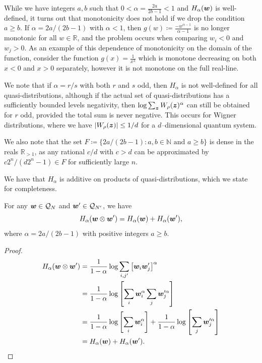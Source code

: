 \documentclass[pra,
aps,
twocolumn,
superscriptaddress,
groupedaddress,
nofootinbib,
reprint
]{revtex4-1}
\begin{document}
While we have integers $a,b$ such that $0 < \alpha=\frac{2a}{2b-1} < 1$ and $H_\alpha(\boldsymbol{w})$ is well-defined, it turns out that monotonicity does not hold if we drop the condition $a \ge b$. If $\alpha =2a/(2b-1)$ with $\alpha < 1$, then $g(w) \coloneqq \frac{-w^{\alpha-1}}{\alpha-1}$ is no longer monotonic for all $w \in \mathbb{R}$, and the problem occurs when comparing $w_i < 0$ and $w_j >0$. As an example of this dependence of monotonicity on the domain of the function, consider the function $g(x) = \frac{1}{x^3}$ which is monotone decreasing on both $x<0$ and $x>0$ separately, however it is not monotone on the full real-line.

We note that if $\alpha =r/s$ with both $r$ and $s$ odd, then $H_\alpha$ is not well-defined for all quasi-distributions, although if the actual set of quasi-distributions has a sufficiently bounded levels negativity, then $\log \sum_{\bm{z}} W_\rho(\bm{z})^\alpha$ can still be obtained for $r$ odd, provided the total sum is never negative. This occurs for Wigner distributions, where we have $|W_\rho(\boldsymbol{z})| \leq 1/d$ for a $d$--dimensional quantum system.

We also note that the set $F \coloneqq \{2a/(2b-1): a,b \in \mathbb{N} \text{ and } a \geq b\}$ is dense in the reals $\mathbb{R}_{>1}$, as any rational $c/d$ with $c>d$ can be approximated by  $c2^n / (d2^n-1) \in F$ for sufficiently large $n$.

We have that $H_{\alpha}$ is additive on products of quasi-distributions, which we state for completeness.
\begin{proposition}\label{H_add}
	For any $\boldsymbol{w} \in \mathcal{Q}_N$ and $\boldsymbol{w}' \in \mathcal{Q}_{N'}$, we have
	\begin{equation}
		H_{\alpha}(\boldsymbol{w}\otimes \boldsymbol{w}') = H_{\alpha}(\boldsymbol{w}) + H_{\alpha}(\boldsymbol{w}'),
	\end{equation}
	where $\alpha = 2a/(2b-1)$ with positive integers $a\ge b$.
\end{proposition}
\begin{proof}
	\begin{align}
		H_{\alpha}(\boldsymbol{w} \otimes \boldsymbol{w}') &= \frac{1}{1-\alpha}\log \sum_{i,j'} \left[\boldsymbol{w}_i \boldsymbol{w}'_j\right]^{\alpha} \nonumber\\
		&= \frac{1}{1-\alpha}\log  \left [ \sum_i\boldsymbol{w}_i^\alpha \sum_j\boldsymbol{w}_j^{\prime \alpha} \right ] \nonumber\\
				&= \frac{1}{1-\alpha}\log  \left [ \sum_i\boldsymbol{w}_i^\alpha\right ] + \frac{1}{1-\alpha}\log \left [ \sum_j\boldsymbol{w}_j^{\prime \alpha} \right ] \nonumber\\
		&= H_{\alpha}(\boldsymbol{w}) + H_{\alpha}(\boldsymbol{w}').
	\end{align}
\end{proof}
\end{document}
